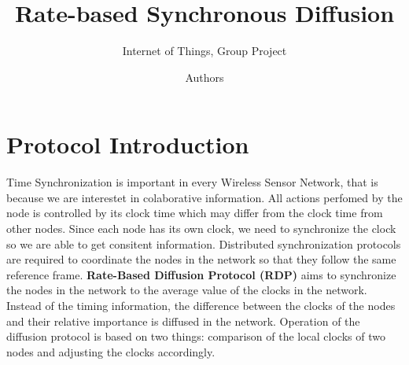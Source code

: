 \documentclass{llncs}
\begin{document}
\title{Rate-based Synchronous Diffusion}


\subtitle{Internet of Things, Group Project}


\author{Authors} 







\maketitle


\section{Protocol Introduction}


Time Synchronization is important in every Wireless Sensor Network, that is because we are interestet in colaborative information. All actions perfomed by the node is controlled by its clock time which may differ from the clock time from other nodes. Since each node has its own clock, we need to synchronize the clock so we are able to get consitent information. Distributed synchronization protocols are required to coordinate the nodes in the network so that they
follow the same reference frame. \textbf{Rate-Based Diffusion Protocol (RDP)} aims to synchronize the nodes in the network to the average value of the clocks in the
network. Instead of the timing information, the difference between the clocks of
the nodes and their relative importance is diffused in the network. Operation of the diffusion protocol is based on two things: comparison of the local clocks of two nodes
and adjusting the clocks accordingly.
\end{document}
